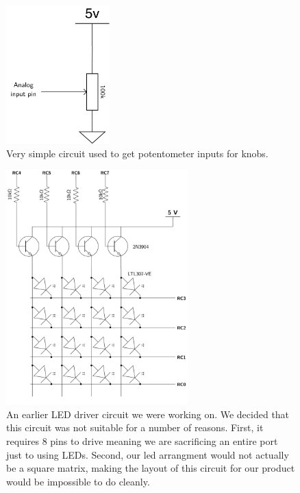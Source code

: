 \documentclass[11pt]{article}
\begin{document}
\begin{figure}[htbp]
\centering
\includegraphics[width=4cm]{./pot.png}
\caption{\label{fig:org1fb9636}
Very simple circuit used to get potentometer inputs for knobs.}
\end{figure}

\begin{figure}[htbp]
\centering
\includegraphics[width=7cm]{./LED_matrix.png}
\caption{\label{fig:org730aa01}
An earlier LED driver circuit we were working on. We decided that this circuit was not suitable for a number of reasons. First, it requires 8 pins to drive meaning we are sacrificing an entire port just to using LEDs. Second, our led arrangment would not actually be a square matrix, making the layout of this circuit for our product would be impossible to do cleanly.}
\end{figure}
\end{document}
